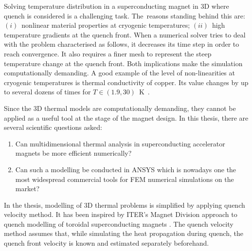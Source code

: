 
Solving temperature distribution in a superconducting magnet in 3D where quench is considered is a challenging task. The~reasons standing behind this are: $(i)$~nonlinear material properties at cryogenic temperatures; $(ii)$~high temperature gradients at the quench front. When a numerical solver tries to deal with the problem characterised as follows, it decreases its time step in order to reach convergence. It also requires a finer mesh to represent the steep temperature change at the quench front. Both implications make the simulation computationally demanding. A good example of the level of non-linearities at cryogenic temperatures is thermal conductivity of copper. Its value changes by up to several dozens of times for $T \in (1.9, 30)$~K~\cite{paudel_thesis}.

Since the 3D thermal models are computationally demanding, they cannot be applied as a useful tool at the stage of the magnet design. In this thesis, there are several scientific questions asked:
\begin{enumerate}
\item Can multidimensional thermal analysis in superconducting accelerator magnets be more efficient numerically?
\item  Can such a modelling be conducted in ANSYS which is nowadays one the most widespread commercial tools for FEM numerical simulations on the market?
\end{enumerate}

In the thesis, modelling of 3D thermal problems is simplified by applying quench velocity method. It has been inspired by ITER's Magnet Division approach to quench modelling of toroidal superconducting magnets \cite{iter_presentation_qualified_analysis, iter_fault_case_study}. The quench velocity method assumes that, while simulating the heat propagation during quench, the quench front velocity is known and estimated separately beforehand. 